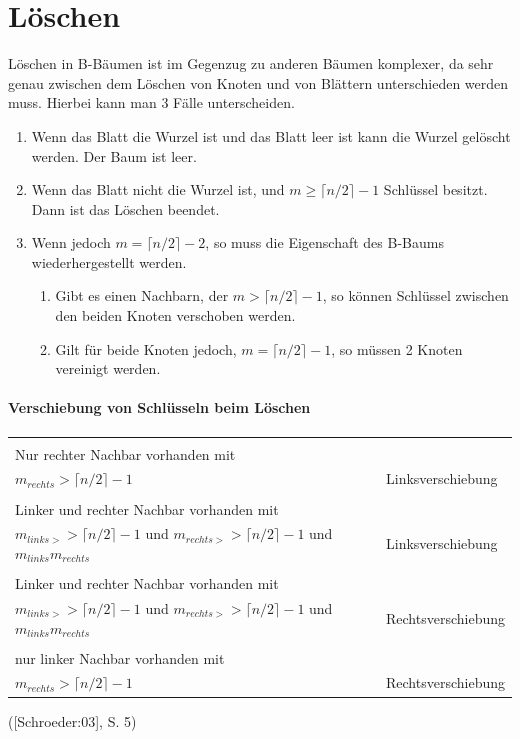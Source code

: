 \section{L\"oschen}
L\"oschen in B-B\"aumen ist im Gegenzug zu anderen B\"aumen komplexer, da sehr genau zwischen dem L\"oschen von Knoten und von Bl\"attern unterschieden werden muss.
Hierbei kann man 3 F\"alle unterscheiden.
\begin{enumerate}
	\item Wenn das Blatt die Wurzel ist und das Blatt leer ist kann die Wurzel gel\"oscht werden. Der Baum ist leer.
	\item Wenn das Blatt nicht die Wurzel ist, und  $m\geq \lceil n/2\rceil-1$ Schl\"ussel besitzt. Dann ist das L\"oschen beendet.
	\item Wenn jedoch $m= \lceil n/2\rceil-2$, so muss die Eigenschaft des B-Baums wiederhergestellt werden.
		\begin{enumerate}
				\item Gibt es einen Nachbarn, der $m> \lceil n/2\rceil-1$, so k\"onnen Schl\"ussel zwischen den beiden Knoten verschoben werden.
				\item Gilt f\"ur beide Knoten jedoch, $m= \lceil n/2\rceil-1$, so m\"ussen 2 Knoten vereinigt werden.
		\end{enumerate}	
\end{enumerate}

\paragraph{Verschiebung von Schl\"usseln beim L\"oschen} 
\begin{tabular}{|l|l|}
	\hline \\Nur rechter Nachbar vorhanden mit\\ $m_{rechts}> \lceil n/2\rceil -1$  & Linksverschiebung  \\ 
	\hline \\Linker und rechter Nachbar vorhanden mit\\ $m_{links>}> \lceil n/2\rceil -1$ und $m_{rechts>}> \lceil n/2\rceil -1$ und $ m_{links} m_{rechts}$ & Linksverschiebung \\ 
	\hline \\Linker und rechter Nachbar vorhanden mit\\ $m_{links>}> \lceil n/2\rceil -1$ und $m_{rechts>}> \lceil n/2\rceil -1$ und $ m_{links} m_{rechts}$ & Rechtsverschiebung \\ 
	\hline \\nur linker Nachbar vorhanden mit\\ $m_{rechts}> \lceil n/2\rceil -1$ & Rechtsverschiebung \\ 
	\hline 
\end{tabular} 
([Schroeder:03], S. 5)
\newpage
